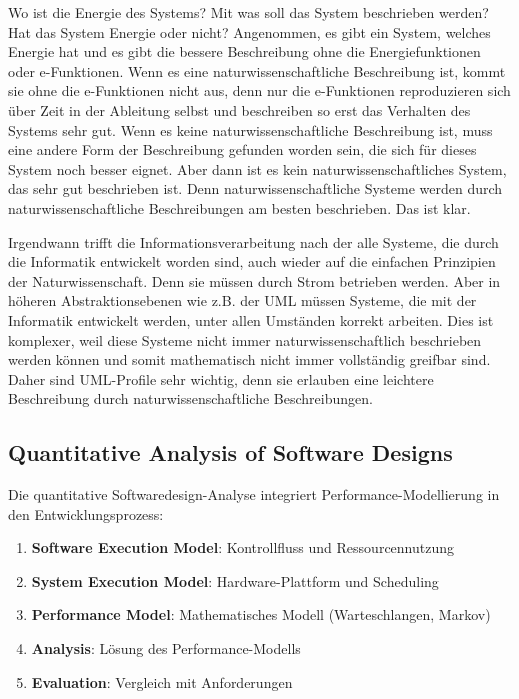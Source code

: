 ﻿\documentclass[a4paper,12pt]{scrreprt}
\theoremstyle{definition}
\begin{document}
Wo ist die Energie des Systems? Mit was soll das System beschrieben werden? Hat das System Energie oder nicht? Angenommen, es gibt ein System, welches Energie hat und es gibt die bessere Beschreibung ohne die Energiefunktionen oder e-Funktionen. Wenn es eine naturwissenschaftliche Beschreibung ist, kommt sie ohne die e-Funktionen nicht aus, denn nur die e-Funktionen reproduzieren sich über Zeit in der Ableitung selbst und beschreiben so erst das Verhalten des Systems sehr gut. Wenn es keine naturwissenschaftliche Beschreibung ist, muss eine andere Form der Beschreibung gefunden worden sein, die sich für dieses System noch besser eignet. Aber dann ist es kein naturwissenschaftliches System, das sehr gut beschrieben ist. Denn naturwissenschaftliche Systeme werden durch naturwissenschaftliche Beschreibungen am besten beschrieben. Das ist klar.

Irgendwann trifft die Informationsverarbeitung nach der alle Systeme, die durch die Informatik entwickelt worden sind, auch wieder auf die einfachen Prinzipien der Naturwissenschaft. Denn sie müssen durch Strom betrieben werden. Aber in höheren Abstraktionsebenen wie z.B. der UML müssen Systeme, die mit der Informatik entwickelt werden, unter allen Umständen korrekt arbeiten. Dies ist komplexer, weil diese Systeme nicht immer naturwissenschaftlich beschrieben werden können und somit mathematisch nicht immer vollständig greifbar sind. Daher sind UML-Profile sehr wichtig, denn sie erlauben eine leichtere Beschreibung durch naturwissenschaftliche Beschreibungen.

\subsection{Quantitative Analysis of Software Designs}

Die quantitative Softwaredesign-Analyse \cite{smith1990} integriert Performance-Modellierung in den Entwicklungsprozess:

\begin{enumerate}
	\item[-] \textbf{Software Execution Model}: Kontrollfluss und Ressourcennutzung
	\item[-] \textbf{System Execution Model}: Hardware-Plattform und Scheduling
	\item[-] \textbf{Performance Model}: Mathematisches Modell (Warteschlangen, Markov)
	\item[-] \textbf{Analysis}: Lösung des Performance-Modells
	\item[-] \textbf{Evaluation}: Vergleich mit Anforderungen
\end{enumerate}
\end{document}
